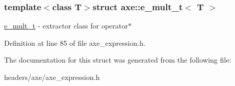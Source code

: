 \subsubsection*{template$<$class T$>$struct axe\+::e\+\_\+mult\+\_\+t$<$ T $>$}

\hyperlink{structaxe_1_1e__mult__t}{e\+\_\+mult\+\_\+t} -\/ extractor class for operator$\ast$ 

Definition at line 85 of file axe\+\_\+expression.\+h.



The documentation for this struct was generated from the following file\+:\begin{DoxyCompactItemize}
\item 
headers/axe/axe\+\_\+expression.\+h\end{DoxyCompactItemize}
